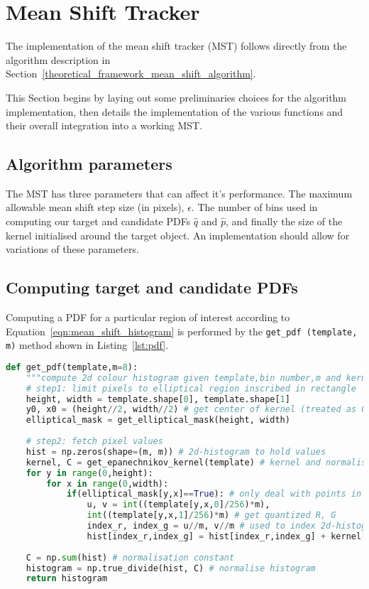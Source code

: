 \section{Mean Shift Tracker}\label{implementation_mean_shift_tracker}
The implementation of the mean shift tracker (MST) follows directly from the algorithm
description in Section~\ref{theoretical_framework_mean_shift_algorithm}.

This Section begins by laying out some preliminaries choices for the algorithm
implementation, then details the implementation of the various functions and
their overall integration into a working MST\@. 

\subsection{Algorithm parameters}
The MST has three parameters that can affect it's performance.
The maximum allowable mean shift step size (in pixels), $\epsilon$. The number
of bins used in computing our target and candidate PDFs $\hat{q}$ and
$\hat{p}$, and finally the size of the kernel initialised around the target
object.
An implementation should allow for variations of these parameters.

\subsection{Computing target and candidate PDFs}
Computing a PDF for a particular region of interest according to 
Equation~\ref{eqn:mean_shift_histogram} is performed by the \lstinline{get_pdf (template, m)} 
method shown in Listing~\ref{lst:pdf}.

\begin{lstlisting}[language=Python, caption={Function computing the PDF}, captionpos=b, label={lst:pdf}]
def get_pdf(template,m=8):
    """compute 2d colour histogram given template,bin number,m and kernel function"""
    # step1: limit pixels to elliptical region inscribed in rectangle
    height, width = template.shape[0], template.shape[1]
    y0, x0 = (height//2, width//2) # get center of kernel (treated as 0,0) == hy and hx 
    elliptical_mask = get_elliptical_mask(height, width)
       
    # step2: fetch pixel values
    hist = np.zeros(shape=(m, m)) # 2d-histogram to hold values 
    kernel, C = get_epanechnikov_kernel(template) # kernel and normalisation constant, C
    for y in range(0,height):
        for x in range(0,width): 
            if(elliptical_mask[y,x]==True): # only deal with points in the mask
                u, v = int((template[y,x,0]/256)*m),
                int((template[y,x,1]/256)*m) # get quantized R, G
                index_r, index_g = u//m, v//m # used to index 2d-histogram
                hist[index_r,index_g] = hist[index_r,index_g] + kernel[y,x] # add weighted point
    
    C = np.sum(hist) # normalisation constant
    histogram = np.true_divide(hist, C) # normalise histogram
    return histogram 
\end{lstlisting}

